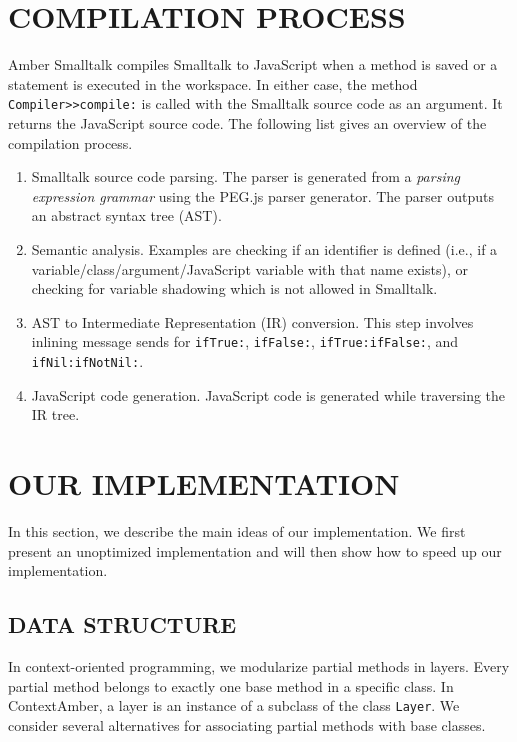 \documentclass{sig-alternate}
\begin{document}
\section{COMPILATION PROCESS}
Amber Smalltalk compiles Smalltalk to JavaScript when a method is saved or a statement is executed in the workspace. In either case, the method \texttt{Compiler>>compile:} is called with the Smalltalk source code as an argument. It returns the JavaScript source code. The following list gives an overview of the compilation process.

\begin{enumerate}
    \item Smalltalk source code parsing. The parser is generated from a \emph{parsing expression grammar} using the PEG.js parser generator. The parser outputs an abstract syntax tree (AST).
    \item Semantic analysis. Examples are checking if an identifier is defined (i.e., if a variable/class/argument/JavaScript variable with that name exists), or checking for variable shadowing which is not allowed in Smalltalk.
    \item AST to Intermediate Representation (IR) conversion. This step involves inlining message sends for \texttt{ifTrue:}, \texttt{ifFalse:}, \texttt{ifTrue:ifFalse:}, and \texttt{ifNil:ifNotNil:}.
    \item JavaScript code generation. JavaScript code is generated while traversing the IR tree.
\end{enumerate}

\section{OUR IMPLEMENTATION}
In this section, we describe the main ideas of our implementation. We first present an unoptimized implementation and will then show how to speed up our implementation.

\subsection{DATA STRUCTURE}
In context-oriented programming, we modularize partial methods in layers. Every partial method belongs to exactly one base method in a specific class. In ContextAmber, a layer is an instance of a subclass of the class \texttt{Layer}. We consider several alternatives for associating partial methods with base classes.
\end{document}
